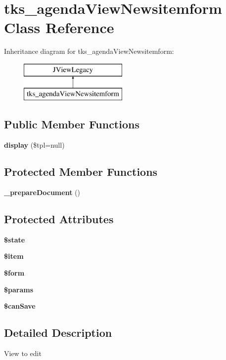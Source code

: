 \section{tks\+\_\+agenda\+View\+Newsitemform Class Reference}
\label{classtks__agenda_view_newsitemform}
Inheritance diagram for tks\+\_\+agenda\+View\+Newsitemform\+:\begin{figure}[H]
\begin{center}
\leavevmode
\includegraphics[height=2.000000cm]{classtks__agenda_view_newsitemform}
\end{center}
\end{figure}
\subsection*{Public Member Functions}
\begin{DoxyCompactItemize}
\item 
\textbf{ display} (\$tpl=null)
\end{DoxyCompactItemize}
\subsection*{Protected Member Functions}
\begin{DoxyCompactItemize}
\item 
\textbf{ \+\_\+prepare\+Document} ()
\end{DoxyCompactItemize}
\subsection*{Protected Attributes}
\begin{DoxyCompactItemize}
\item 
\textbf{ \$state}
\item 
\textbf{ \$item}
\item 
\textbf{ \$form}
\item 
\textbf{ \$params}
\item 
\textbf{ \$can\+Save}
\end{DoxyCompactItemize}


\subsection{Detailed Description}
View to edit

